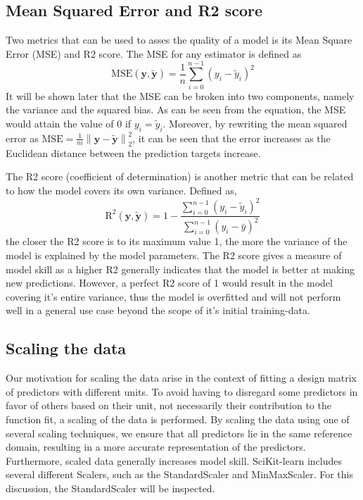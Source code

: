 \documentclass[11pt, a4paper]{article}
\begin{document}
\subsection*{Mean Squared Error and R2 score}
Two metrics that can be used to asses the quality of a model is its Mean Square Error (MSE) and R2 score. The MSE for any estimator is defined as
\[
  \text{MSE}(\boldsymbol{y},\boldsymbol{\tilde{y}}) = \frac{1}{n}
  \sum_{i=0}^{n-1}(y_i-\tilde{y}_i)^2
\]
It will be shown later that the MSE can be broken into two components, namely the variance and the squared bias. As can be seen from the equation, the MSE would attain the value of 0 if $y_i = \tilde{y}_i$. Moreover, by rewriting the mean squared error as $\text{MSE} = \frac{1}{m}\left\lVert \bm{y} - \bm{\tilde{y}}\right\rVert_2^2$, it can be seen that the error increases as the Euclidean distance between the prediction targets increase. \cite{Goodfellow2016}

The R2 score (coefficient of determination) is another metric that can be related to how the model covers its own variance. Defined as,
\[
  \text{R}^2(\boldsymbol{y}, \tilde{\boldsymbol{y}}) = 1 - \frac{\sum_{i=0}^{n - 1} (y_i - \tilde{y}_i)^2}{\sum_{i=0}^{n - 1} (y_i - \bar{y})^2}
\] the closer the R2 score is to its maximum value 1, the more the variance of the model is explained by the model parameters. The R2 score gives a measure of model skill as a higher R2 generally indicates that the model is better at making new predictions. However, a perfect R2 score of 1 would result in the model covering it's entire variance, thus the model is overfitted and will not perform well in a general use case beyond the scope of it's initial training-data.


\subsection*{Scaling the data}
Our motivation for scaling the data arise in the context of fitting a design matrix of predictors with different units. To avoid having to disregard some predictors in favor of others based on their unit, not necessarily their contribution to the function fit, a scaling of the data is performed. By scaling the data using one of several scaling techniques, we ensure that all predictors lie in the same reference domain, resulting in a more accurate representation of the predictors. Furthermore, scaled data generally increases model skill. SciKit-learn includes several different Scalers, such as the StandardScaler and MinMaxScaler. \cite{scikit-learn} For this discussion, the StandardScaler will be inspected.
\end{document}
